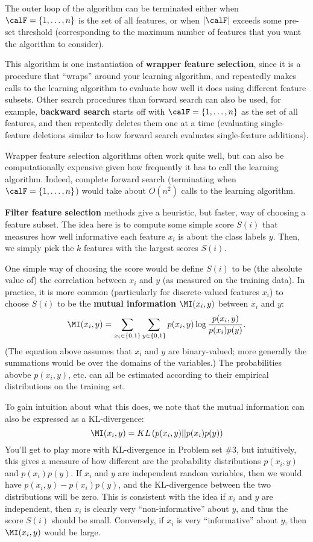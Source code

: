 \documentclass{article}
\begin{document}
The outer loop of the algorithm can be terminated either 
when $\calF = \{1, \ldots, n\}$ is 
the set of all features, or when $|\calF|$ exceeds some pre-set threshold
(corresponding to the maximum number of features that you want the algorithm
to consider).

This algorithm is one instantiation of {\bf wrapper feature selection},
since it is a procedure that ``wraps'' around your learning algorithm, 
and repeatedly makes calls to the learning algorithm to evaluate how
well it does using different feature subsets.  Other search procedures
than forward search can also be used, for example, {\bf backward search}
starts off with $\calF = \{1, \ldots, n\}$ as the set of all features,
and then repeatedly deletes them one at a time (evaluating single-feature
deletions similar to how forward search evaluates single-feature additions).

Wrapper feature selection algorithms often work quite well, but can also
be computationally expensive given how frequently it has to call the learning
algorithm. Indeed, complete forward search (terminating when $\calF = \{1,\ldots,n\}$)
would take about $O(n^2)$ calls to the learning algorithm. 

{\bf Filter feature selection} methods give a heuristic,
but faster, way 
of choosing a feature subset.  The idea here is to compute some 
simple score $S(i)$ that measures how well informative each 
feature $x_i$ is about the class labels $y$.  Then, we simply pick the
$k$ features with the largest scores $S(i)$.  

One simple way of choosing the score would be define $S(i)$ to be (the
absolute value of) the correlation between $x_i$ and $y$ (as measured on the training data).  In
practice, it is more common (particularly for discrete-valued features $x_i$)
to choose $S(i)$ to be the {\bf mutual information} $\MI(x_i, y)$ between
$x_i$ and $y$:
\[
\MI(x_i,y) = \sum_{x_i \in \{0,1\}} \sum_{y \in \{0,1\}} p(x_i, y) \log \frac{p(x_i,y)}{p(x_i)p(y)}. 
\]
(The equation above assumes that $x_i$ and $y$ are binary-valued; more generally 
the summations would be over the domains of the variables.)  The probabilities abovbe 
$p(x_i, y)$, etc. can all be estimated according to their empirical distributions on
the training set. 

To gain intuition
about what this does, we note that the mutual information can also be expressed as a KL-divergence:
\[
\MI(x_i,y) = KL\left(p(x_i,y) || p(x_i) p(y)\right)
\]
You'll get to play more with KL-divergence in Problem set \#3, but intuitively, 
this gives a measure of how different are the probability 
distributions 
$p(x_i,y)$ and $p(x_i) p(y)$.  If $x_i$ and $y$ are independent random variables,
then we would have $p(x_i,y) - p(x_i) p(y)$, and the KL-divergence between the 
two distributions will be zero.  This is consistent with the idea if $x_i$ and $y$
are independent, then $x_i$ is clearly very ``non-informative'' about $y$, and thus
the score $S(i)$ should be small.  Conversely, if $x_i$ is very ``informative''
about $y$, then $\MI(x_i,y)$ would be large. 
\end{document}
